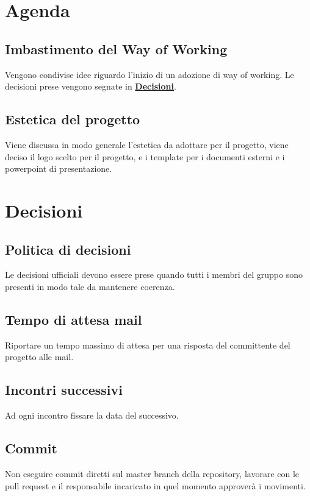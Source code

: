 \documentclass{article}
\begin{document}
\section{Agenda}
\subsection{Imbastimento del Way of Working}
Vengono condivise idee riguardo l'inizio di un adozione di way of working. Le decisioni prese vengono segnate in \hyperref[sec:decisioni]{\textbf{Decisioni}}.
\subsection{Estetica del progetto}
Viene discussa in modo generale l'estetica da adottare per il progetto, viene deciso il logo scelto per il progetto, e i template per i documenti esterni e i powerpoint di presentazione.
\section{Decisioni}
\label{sec:decisioni}
\subsection{Politica di decisioni}
Le decisioni ufficiali devono essere prese quando tutti i membri del gruppo sono presenti in modo tale da mantenere coerenza.
\subsection{Tempo di attesa mail}
Riportare un tempo massimo di attesa per una risposta del committente del progetto alle mail.
\subsection{Incontri successivi}
Ad ogni incontro fissare la data del successivo.
\subsection{Commit}
Non eseguire commit diretti sul master branch della repository, lavorare con le pull request e il responsabile incaricato in quel momento approverà i movimenti.
\end{document}
